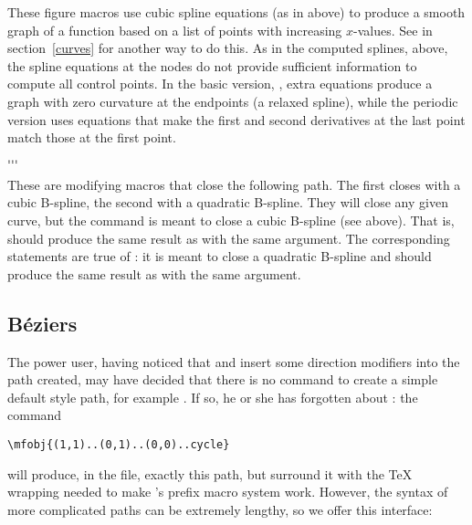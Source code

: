 \documentclass[letterpaper]{article}
\begin{document}
These figure macros use cubic spline equations (as in
 above) to produce a smooth graph of a function based
on a list of points with increasing $x$-values. See  in
section~\ref{curves} for another way to do this. As in the computed
splines, above, the spline equations at the nodes do not provide
sufficient information to compute all control points. In the basic
version, , extra equations produce a graph with zero
curvature at the endpoints (a relaxed spline), while the periodic
version uses equations that make the first and second derivatives at the
last point match those at the first point.

\begin{cd}
$\ldots$\\
$\ldots$%
%
\end{cd}

These are modifying macros that close the following path. The first
closes with a cubic B-spline, the second with a quadratic B-spline. They
will close any given curve, but the command  is meant to
close a cubic B-spline (see above). That is, 
should produce the same result as  with the same
argument. The corresponding statements are true of : it is
meant to close a quadratic B-spline and  should
produce the same result as  with the same argument.

\subsection{B\'eziers}

The power user, having noticed that  and  insert
some direction modifiers into the path created, may have decided that
there is no \mfp{} command to create a simple \MF{} default style path,
for example . If so, he or she has forgotten
about : the command
\begin{verbatim}
\mfobj{(1,1)..(0,1)..(0,0)..cycle}
\end{verbatim}
will produce, in the  file, exactly this path, but surround it
with the \TeX{} wrapping needed to make \mfp{}'s prefix macro system work.
However, the syntax of more complicated paths can be extremely lengthy,
so we offer this interface:

\begin{cd}
  \\
%
\end{cd}
\end{document}
